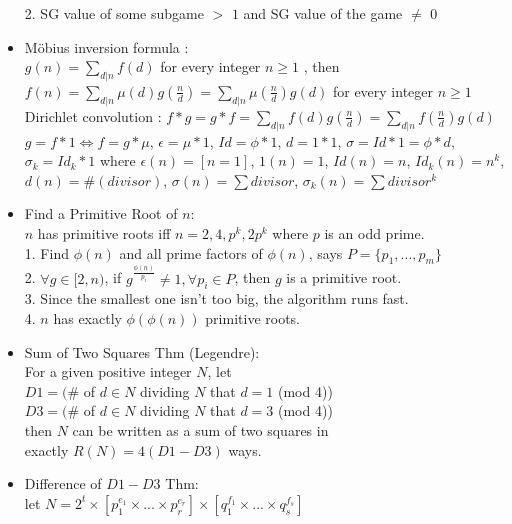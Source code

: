\begin{itemize}
  2. SG value of some subgame $>$ $1$ and SG value of the game $\neq$ $0$
\item Möbius inversion formula :\\
  $g(n) = \sum\limits_{d|n}f(d)$ for every integer $n\ge 1$ , then\\
  $f(n) = \sum\limits_{d|n}\mu(d)g(\frac{n}{d}) = \sum\limits_{d|n}\mu(\frac{n}{d})g(d)$ for every integer $n\ge 1$\\
  Dirichlet convolution : $f*g=g*f=\sum\limits_{d|n}f(d)g(\frac{n}{d})=\sum\limits_{d|n}f(\frac{n}{d})g(d)$\\
  $g=f*1\Leftrightarrow f=g*\mu$, $\epsilon=\mu*1$, $Id=\phi*1$, $d=1*1$, $\sigma=Id*1=\phi*d$,\\
  $\sigma_k=Id_k*1$ where $\epsilon(n)=[n=1]$, $1(n)=1$, $Id(n)=n$, $Id_k(n)=n^k$,\\
  $d(n)=\#(divisor)$, $\sigma(n)=\sum divisor$, $\sigma_k(n)=\sum divisor^k$
\item Find a Primitive Root of $n$:\\
  $n$ has primitive roots iff $n=2,4,p^k,2p^k$ where $p$ is an odd prime.\\
  1. Find $\phi(n)$ and all prime factors of $\phi(n)$, says $P=\{p_1,...,p_m\}$\\
  2. $\forall g\in[2,n)$, if $g^{\frac{\phi(n)}{p_i}}\ne 1,\forall p_i\in P$, then $g$ is a primitive root.\\
  3. Since the smallest one isn't too big, the algorithm runs fast.\\
  4. $n$ has exactly $\phi(\phi(n))$ primitive roots.
\item Sum of Two Squares Thm (Legendre):\\
  For a given positive integer $N$, let\\
  $D1 = (\#$ of $d \in N$ dividing $N$ that $d=1$ (mod 4))\\
  $D3 = (\#$ of $d \in N$ dividing $N$ that $d=3$ (mod 4))\\
  then $N$ can be written as a sum of two squares in\\
  exactly $R(N) = 4(D1-D3)$ ways.
\item Difference of $D1-D3$ Thm:\\
  let $N=2^t \times [p_1^{e_1} \times ...\times p_r^{e_r}] \times [q_1^{f_1} \times ...\times q_s^{f_s}]$\\

\end{itemize}
